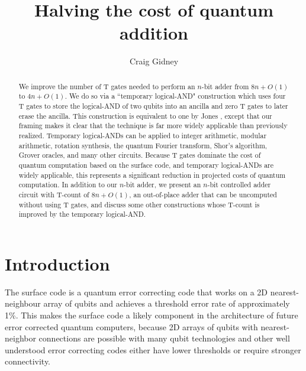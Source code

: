 \documentclass[twocolumn,accepted=2018-05-25]{quantumarticle}
\begin{document}
\title{Halving the cost of quantum addition}
\author{Craig Gidney}

\begin{abstract}
We improve the number of T gates needed to perform an $n$-bit adder from $8n + O(1)$ \cite{Amy2013, Cuccaro2004, AustinDiscussionsAndEmails2017} to $4n + O(1)$.
We do so via a ``temporary logical-AND" construction which uses four T gates to store the logical-AND of two qubits into an ancilla and zero T gates to later erase the ancilla.
This construction is equivalent to one by Jones \cite{Jones2013}, except that our framing makes it clear that the technique is far more widely applicable than previously realized.
Temporary logical-ANDs can be applied to integer arithmetic, modular arithmetic, rotation synthesis, the quantum Fourier transform, Shor's algorithm, Grover oracles, and many other circuits.
Because T gates dominate the cost of quantum computation based on the surface code, and temporary logical-ANDs are widely applicable, this represents a significant reduction in projected costs of quantum computation.
In addition to our $n$-bit adder, we present an $n$-bit controlled adder circuit with T-count of $8n + O(1)$, an out-of-place adder that can be uncomputed without using T gates, and discuss some other constructions whose T-count is improved by the temporary logical-AND.
\end{abstract}

\maketitle

\section*{Introduction}

The surface code \cite{Brav98,Denn02,Raus07,Raus07d,Fowler2012} is a quantum error correcting code that works on a 2D nearest-neighbour array of qubits and achieves a threshold error rate of approximately 1\%.
This makes the surface code a likely component in the architecture of future error corrected quantum computers, because 2D arrays of qubits with nearest-neighbor connections are possible with many qubit technologies \cite{Schl11,Bare13,Gamb17,Leik17,Laht17} and other well understood error correcting codes either have lower thresholds or require stronger connectivity.
\end{document}
